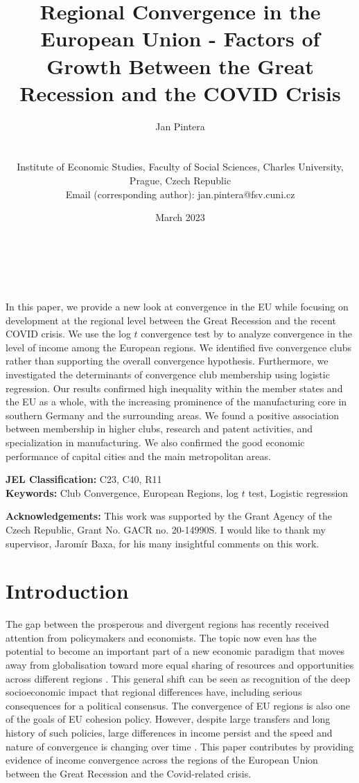 \documentclass[11pt]{article}
\title{Regional Convergence in the European Union - Factors of Growth Between the Great Recession and the COVID Crisis}
\author{
        \begin{large}Jan Pintera\end{large} \\\vspace{5mm} \begin{small} Institute of Economic Studies, Faculty of Social Sciences, Charles University,\\ Prague, Czech Republic\\
        Email (corresponding author): jan.pintera@fsv.cuni.cz \end{small}
}
\date{March 2023}
\makeatletter
\renewcommand{\maketitle}{\bgroup\setlength{\parindent}{0pt}
\begin{flushright}
  \textbf{\@title}\\
  \vspace{5mm}
  \@author\\
  \vspace{5mm}
  \@date
\end{flushright}\egroup
}
\renewenvironment{abstract}
 {\small
  \begin{flushleft}
  \bfseries \abstractname\vspace{-.5em}\vspace{0pt}
  \end{flushleft}
  \list{}{%
    \setlength{\leftmargin}{0mm}%
    \setlength{\rightmargin}{\leftmargin}%
  }%
  \item\relax}
 {\endlist}
\def \Keywords {Club Convergence, European Regions, log $t$ test, Logistic regression}
\makeatother
\begin{document}
\maketitle


\thispagestyle{empty}
\begin{abstract}
In this paper, we provide a new look at convergence in the EU while focusing on development at the regional level between the Great Recession and the recent COVID crisis. We use the log $t$ convergence test by \citet{phillips2007transition} to analyze convergence in the level of income among the European regions. We identified five convergence clubs rather than supporting the overall convergence hypothesis. Furthermore, we investigated the determinants of convergence club membership using logistic regression. Our results confirmed high inequality within the member states and the EU as a whole, with the increasing prominence of the manufacturing core in southern Germany and the surrounding areas. We found a positive association between membership in higher clubs, research and patent activities, and specialization in manufacturing. We also confirmed the good economic performance of capital cities and the main metropolitan areas.

\bigskip


\textbf{JEL Classification:} C23, C40, R11 \\
\textbf{Keywords:}  \Keywords \\

\bigskip

\textbf{Acknowledgements:} This work was supported by the Grant Agency of the Czech Republic, Grant No. GACR no. 20-14990S. I would like to thank my supervisor, Jaromír Baxa, for his many insightful comments on this work.

\end{abstract}
\clearpage
\setcounter{page}{1}

\section{Introduction}
The gap between the prosperous and divergent regions has recently received attention from policymakers and economists. The topic now even has the potential to become an important part of a new economic paradigm that moves away from globalisation toward more equal sharing of resources and opportunities across different regions \citep{rodrik_2022}. This general shift can be seen as recognition of the deep socioeconomic impact that regional differences have, including serious consequences for a political consensus. The convergence of EU regions is also one of the goals of EU cohesion policy. However, despite large transfers and long history of such policies, large differences in income persist and the speed and nature of convergence is changing over time \citep{eckey2007convergence,zarotiadis2013european, iammarino2019regional}.
This paper contributes by providing evidence of income convergence across the regions of the European Union between the Great Recession and the Covid-related crisis.
\end{document}
